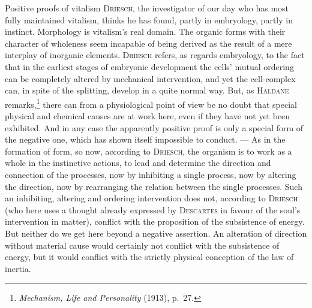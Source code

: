 \documentclass[12pt]{book}
\newcommand{\opage}[1]{\marginnote{\footnotesize\textit{[#1]}}}
\begin{document}
Positive proofs of vitalism \textsc{Driesch}, the investigator of our day who has most
fully maintained vitalism, thinks he has found, partly in embryology, partly in
instinct. Morphology is vitalism's real domain. The organic forms with their character
of wholeness seem incapable of being derived as the result of a mere interplay of
inorganic elements. \textsc{Driesch} refers, as regards embryology, to the fact that
in the earliest stages of embryonic development the cells' mutual ordering can be
completely altered by mechanical intervention, and yet the cell-complex can, in spite
of the splitting, develop in a quite normal way. But, as \textsc{Haldane}
remarks,\footnote{\textit{Mechanism, Life and Personality} (1913), p.\ 27.} there can
from a \opage{54}physiological point of view be no doubt that special physical and chemical
causes are at work here, even if they have not yet been exhibited. And in any case the
apparently positive proof is only a special form of the negative one, which has shown
itself impossible to conduct. --- As in the formation of form, so now, according to
\textsc{Driesch}, the organism is to work as a whole in the instinctive actions, to
lead and determine the direction and connection of the processes, now by inhibiting a
single process, now by altering the direction, now by rearranging the relation between
the single processes. Such an inhibiting, altering and ordering intervention does not,
according to \textsc{Driesch} (who here uses a thought already expressed by
\textsc{Descartes} in favour of the soul's intervention in matter), conflict with the
proposition of the subsistence of energy. But neither do we get here beyond a negative
assertion. An alteration of direction without material cause would certainly not
conflict with the subsistence of energy, but it would conflict with the strictly
physical conception of the law of inertia.
\end{document}

